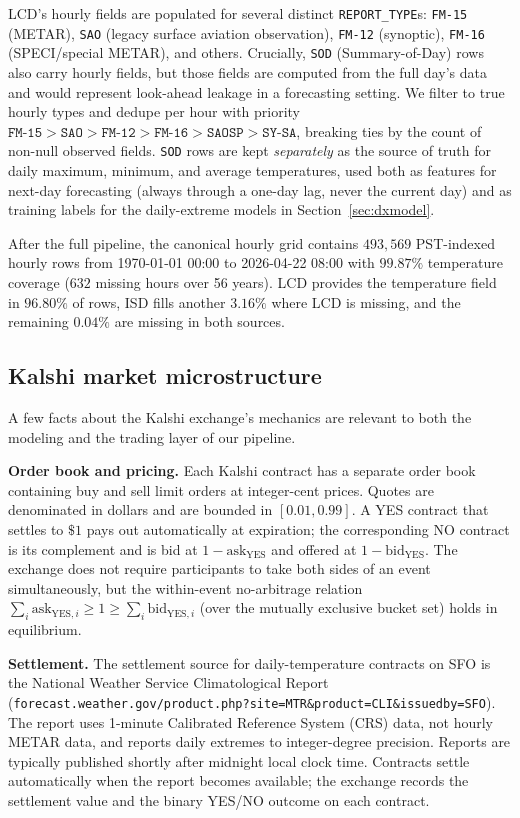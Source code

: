 \documentclass[11pt]{article}
\begin{document}
LCD's hourly fields are populated for several distinct \texttt{REPORT\_TYPE}s:
\texttt{FM-15} (METAR), \texttt{SAO} (legacy surface aviation observation),
\texttt{FM-12} (synoptic), \texttt{FM-16} (SPECI/special METAR), and others.
Crucially, \texttt{SOD} (Summary-of-Day) rows also carry hourly fields, but
those fields are computed from the full day's data and would represent
look-ahead leakage in a forecasting setting. We filter to true hourly types
and dedupe per hour with priority $\texttt{FM-15} > \texttt{SAO} >
\texttt{FM-12} > \texttt{FM-16} > \texttt{SAOSP} > \texttt{SY-SA}$, breaking
ties by the count of non-null observed fields. \texttt{SOD} rows are kept
\emph{separately} as the source of truth for daily maximum, minimum, and
average temperatures, used both as features for next-day forecasting (always
through a one-day lag, never the current day) and as training labels for
the daily-extreme models in Section~\ref{sec:dxmodel}.

After the full pipeline, the canonical hourly grid contains $493{,}569$
PST-indexed hourly rows from 1970-01-01 00:00 to 2026-04-22 08:00 with
$99.87\%$ temperature coverage ($632$ missing hours over 56 years).
LCD provides the temperature field in $96.80\%$ of rows, ISD fills another
$3.16\%$ where LCD is missing, and the remaining $0.04\%$ are missing in
both sources.

\subsection{Kalshi market microstructure}

A few facts about the Kalshi exchange's mechanics are relevant to both
the modeling and the trading layer of our pipeline.

\textbf{Order book and pricing.} Each Kalshi contract has a separate
order book containing buy and sell limit orders at integer-cent prices.
Quotes are denominated in dollars and are bounded in $[0.01, 0.99]$. A
YES contract that settles to $\$1$ pays out automatically at expiration;
the corresponding NO contract is its complement and is bid at
$1 - \text{ask}_\text{YES}$ and offered at $1 - \text{bid}_\text{YES}$.
The exchange does not require participants to take both sides of an
event simultaneously, but the within-event no-arbitrage relation
$\sum_i \mathrm{ask}_{\text{YES},i} \ge 1 \ge \sum_i \mathrm{bid}_{\text{YES},i}$
(over the mutually exclusive bucket set) holds in equilibrium.

\textbf{Settlement.} The settlement source for daily-temperature contracts
on SFO is the National Weather Service Climatological Report
(\texttt{forecast.weather.gov/product.php?site=MTR\&product=CLI\&issuedby=SFO}).
The report uses 1-minute Calibrated Reference System (CRS) data, not
hourly METAR data, and reports daily extremes to integer-degree precision.
Reports are typically published shortly after midnight local clock time.
Contracts settle automatically when the report becomes available; the
exchange records the settlement value and the binary YES/NO outcome on
each contract.
\end{document}
